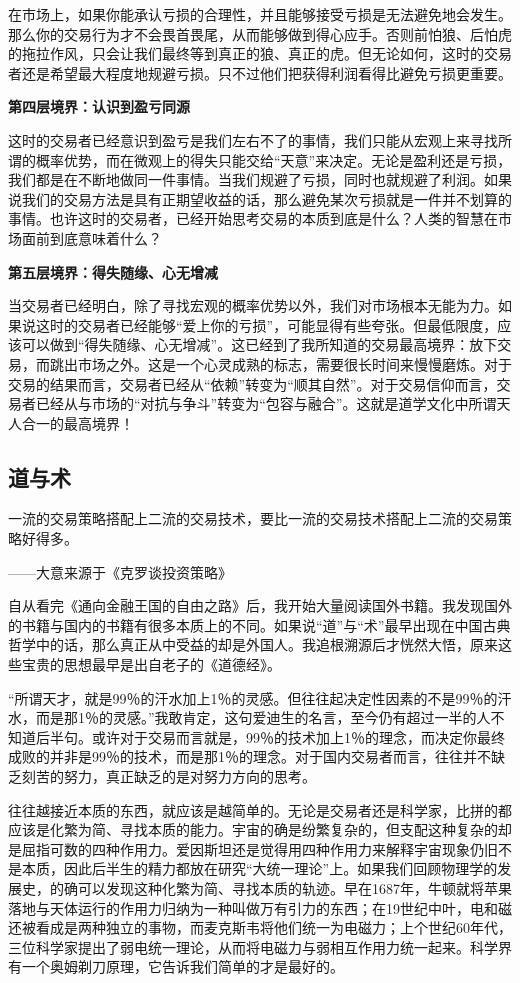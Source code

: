 在市场上，如果你能承认亏损的合理性，并且能够接受亏损是无法避免地会发生。那么你的交易行为才不会畏首畏尾，从而能够做到得心应手。否则前怕狼、后怕虎的拖拉作风，只会让我们最终等到真正的狼、真正的虎。但无论如何，这时的交易者还是希望最大程度地规避亏损。只不过他们把获得利润看得比避免亏损更重要。

\textbf{第四层境界：认识到盈亏同源}

这时的交易者已经意识到盈亏是我们左右不了的事情，我们只能从宏观上来寻找所谓的概率优势，而在微观上的得失只能交给“天意”来决定。无论是盈利还是亏损，我们都是在不断地做同一件事情。当我们规避了亏损，同时也就规避了利润。如果说我们的交易方法是具有正期望收益的话，那么避免某次亏损就是一件并不划算的事情。也许这时的交易者，已经开始思考交易的本质到底是什么？人类的智慧在市场面前到底意味着什么？

\textbf{第五层境界：得失随缘、心无增减}

当交易者已经明白，除了寻找宏观的概率优势以外，我们对市场根本无能为力。如果说这时的交易者已经能够“爱上你的亏损”，可能显得有些夸张。但最低限度，应该可以做到“得失随缘、心无增减”。这已经到了我所知道的交易最高境界：放下交易，而跳出市场之外。这是一个心灵成熟的标志，需要很长时间来慢慢磨炼。对于交易的结果而言，交易者已经从“依赖”转变为“顺其自然”。对于交易信仰而言，交易者已经从与市场的“对抗与争斗”转变为“包容与融合”。这就是道学文化中所谓天人合一的最高境界！

\subsection{道与术}

{\kaishu
一流的交易策略搭配上二流的交易技术，要比一流的交易技术搭配上二流的交易策略好得多。

\hfill ——大意来源于《克罗谈投资策略》
}

自从看完《通向金融王国的自由之路》后，我开始大量阅读国外书籍。我发现国外的书籍与国内的书籍有很多本质上的不同。如果说“道”与“术”最早出现在中国古典哲学中的话，那么真正从中受益的却是外国人。我追根溯源后才恍然大悟，原来这些宝贵的思想最早是出自老子的《道德经》。

“所谓天才，就是99％的汗水加上1％的灵感。但往往起决定性因素的不是99％的汗水，而是那1％的灵感。”我敢肯定，这句爱迪生的名言，至今仍有超过一半的人不知道后半句。或许对于交易而言就是，99％的技术加上1％的理念，而决定你最终成败的并非是99％的技术，而是那1％的理念。对于国内交易者而言，往往并不缺乏刻苦的努力，真正缺乏的是对努力方向的思考。

往往越接近本质的东西，就应该是越简单的。无论是交易者还是科学家，比拼的都应该是化繁为简、寻找本质的能力。宇宙的确是纷繁复杂的，但支配这种复杂的却是屈指可数的四种作用力。爱因斯坦还是觉得用四种作用力来解释宇宙现象仍旧不是本质，因此后半生的精力都放在研究“大统一理论”上。如果我们回顾物理学的发展史，的确可以发现这种化繁为简、寻找本质的轨迹。早在1687年，牛顿就将苹果落地与天体运行的作用力归纳为一种叫做万有引力的东西；在19世纪中叶，电和磁还被看成是两种独立的事物，而麦克斯韦将他们统一为电磁力；上个世纪60年代，三位科学家提出了弱电统一理论，从而将电磁力与弱相互作用力统一起来。科学界有一个奥姆剃刀原理，它告诉我们简单的才是最好的。

